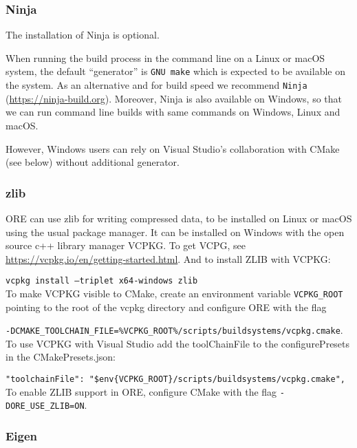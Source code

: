\subsubsection*{Ninja}

The installation of Ninja is optional.

When running the build process in the command line on a Linux or macOS system, the default ``generator'' is {\tt GNU make} which is
expected to be available on the system. As an alternative and for build speed we recommend {\tt Ninja} (\url{https://ninja-build.org}).
Moreover, Ninja is also available on Windows, so that we can run command line builds with same commands on Windows, Linux and macOS.

However, Windows users can rely on Visual Studio's collaboration with CMake (see below) without additional generator.

\subsubsection*{zlib}

ORE can use zlib for writing compressed data, to be installed on Linux or macOS using the usual package manager.
It can be installed on Windows with the open source c++ library manager VCPKG.
To get VCPG, see \url{https://vcpkg.io/en/getting-started.html}. And to install ZLIB with VCPKG:

\medskip
{\tt vcpkg install --triplet x64-windows zlib} \\

\medskip
To make VCPKG visible to CMake, create an environment variable {\tt VCPKG\_ROOT} pointing to the root of the vcpkg directory
and configure ORE with the flag

\medskip
{\tt -DCMAKE\_TOOLCHAIN\_FILE=\%VCPKG\_ROOT\%/scripts/buildsystems/vcpkg.cmake}. \\

\medskip
To use VCPKG with Visual Studio add the toolChainFile to the configurePresets in the CMakePresets.json:

\medskip
{\tt "toolchainFile": "\$env\{VCPKG\_ROOT\}/scripts/buildsystems/vcpkg.cmake",}\\

\medskip
To enable ZLIB support in ORE, configure CMake with the flag {\tt -DORE\_USE\_ZLIB=ON}.

\subsubsection*{Eigen}

